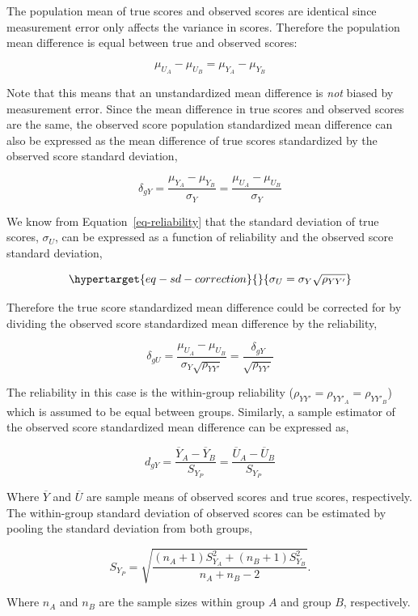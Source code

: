 \documentclass[
  letterpaper,
  DIV=11,
  numbers=noendperiod]{scrreprt}
\begin{document}
The population mean of true scores and observed scores are identical
since measurement error only affects the variance in scores. Therefore
the population mean difference is equal between true and observed
scores:

\[
\mu_{U_A} - \mu_{U_B} = \mu_{Y_A} - \mu_{Y_B}
\]

Note that this means that an unstandardized mean difference is
\emph{not} biased by measurement error. Since the mean difference in
true scores and observed scores are the same, the observed score
population standardized mean difference can also be expressed as the
mean difference of true scores standardized by the observed score
standard deviation,

\[
\delta_{gY} = \frac{\mu_{Y_A} - \mu_{Y_B}}{\sigma_Y}  = \frac{\mu_{U_A} - \mu_{U_B}}{\sigma_Y}
\]

We know from Equation~\ref{eq-reliability} that the standard deviation
of true scores, \(\sigma_U\), can be expressed as a function of
reliability and the observed score standard deviation,

\begin{equation}\protect\hypertarget{eq-sd-correction}{}{
\sigma_U = \sigma_Y\sqrt{\rho_{YY'}}
}\label{eq-sd-correction}\end{equation}

Therefore the true score standardized mean difference could be corrected
for by dividing the observed score standardized mean difference by the
reliability,

\[
\delta_{gU} = \frac{\mu_{U_A} - \mu_{U_B}}{\sigma_Y\sqrt{\rho_{YY'}}} = \frac{\delta_{gY}}{\sqrt{\rho_{YY'}}}
\]

The reliability in this case is the within-group reliability
(\(\rho_{YY'}=\rho_{YY'_A}=\rho_{YY'_B}\)) which is assumed to be equal
between groups. Similarly, a sample estimator of the observed score
standardized mean difference can be expressed as,

\[
d_{gY} = \frac{\overline{Y}_A - \overline{Y}_B}{S_{Y_P}}  = \frac{\overline{U}_A - \overline{U}_B}{S_{Y_P}}
\]

Where \(\overline{Y}\) and \(\overline{U}\) are sample means of observed
scores and true scores, respectively. The within-group standard
deviation of observed scores can be estimated by pooling the standard
deviation from both groups,

\[
S_{Y_P} = \sqrt{\frac{(n_A+1)S^2_{Y_A}+(n_B+1)S^2_{Y_B}}{n_A + n_B - 2}}.
\]

Where \(n_A\) and \(n_B\) are the sample sizes within group \(A\) and
group \(B\), respectively.
\end{document}
